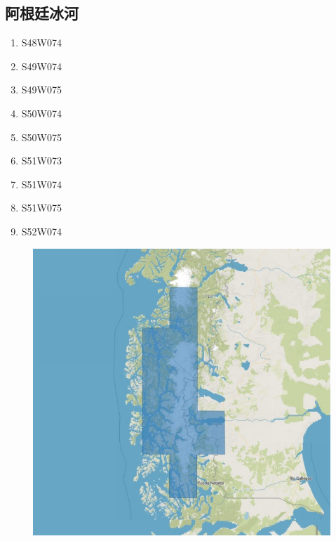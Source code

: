 \documentclass[a4paper, 12pt]{article}
\begin{document}
\begin{appendices}
\subsection{阿根廷冰河}
\begin{multicols}{3}
\begin{enumerate}
    \item S48W074
    \item S49W074
    \item S49W075
    \item S50W074
    \item S50W075
    \item S51W073
    \item S51W074
    \item S51W075
    \item S52W074
\end{enumerate}
\end{multicols}
\begin{figure}[H]
    \centering
    \includegraphics[width=0.8\linewidth]{fig/a4.jpg}
\end{figure}

\end{appendices}
\end{document}
